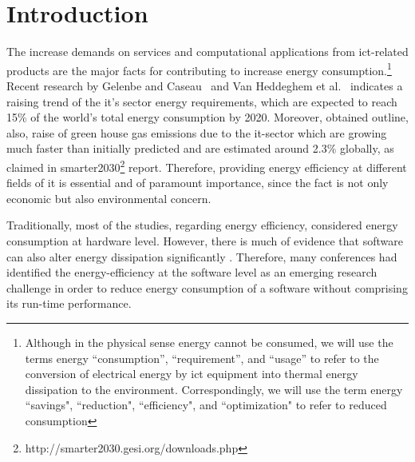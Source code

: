 \section{Introduction}
The increase demands on services and computational applications 
from {\sc ict}-related products are the major facts for contributing 
to increase energy consumption.{\footnote{Although in the physical sense energy 
		cannot be consumed, we will use the terms energy ``consumption'', 
		``requirement'', and ``usage'' to refer to the conversion of 
		electrical energy by {\sc ict} equipment into thermal energy 
		dissipation to the environment. 
		Correspondingly, we will use the term energy ``savings", 
		``reduction", ``efficiency", and ``optimization" to refer 
		to reduced consumption}} 
Recent research by Gelenbe and Caseau~ and 
Van Heddeghem et al.~ indicates a 
raising trend of the {\sc it}'s sector energy requirements, which are 
expected to reach 15\% of the world's total energy consumption 
by 2020. 
Moreover, obtained  outline, also, raise of green house gas 
emissions due to the {\sc it}-sector which are growing much faster 
than initially predicted and are estimated around 2.3\% globally, as 
claimed in {\sc smart}er2030\footnote{http://smarter2030.gesi.org/downloads.php} 
report.
Therefore, providing energy efficiency at different fields of 
{\sc it} is essential and of paramount importance, since the fact 
is not only economic but also environmental concern. 

Traditionally, most of the studies, regarding energy efficiency, 
considered energy consumption at hardware level. 
However, there is much of evidence that software can also 
alter energy dissipation significantly \cite{eder_energy_consumptions, 
capra_is_2012, ferreira_seflab_2013}. 
Therefore, many conferences had identified the energy-efficiency 
at the software level as an emerging research challenge in order 
to reduce energy consumption of a software without comprising its 
run-time performance.




